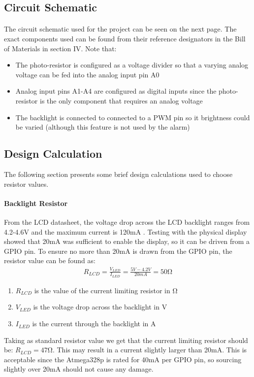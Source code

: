 \documentclass{article}
\begin{document}
\subsection{Circuit Schematic}
\paragraph{}
The circuit schematic used for the project can be seen on the next page. The exact components used can be found from their reference designators in the Bill of Materials in section IV. Note that:
\begin{itemize}
    \item The photo-resistor is configured as a voltage divider so that a varying analog voltage can be fed into the analog input pin A0
    \item Analog input pins A1-A4 are configured as digital inputs since the photo-resistor is the only component that requires an analog voltage
    \item The backlight is connected to connected to a PWM pin so it brightness could be varied (although this feature is not used by the alarm)
\end{itemize}

\subsection{Design Calculation}
The following section presents some brief design calculations used to choose resistor values.

\paragraph{Backlight Resistor} From the LCD datasheet, the voltage drop across the LCD backlight ranges from 4.2-4.6V and the maximum current is 120mA \cite{lcd}. Testing with the physical display showed that 20mA was sufficient to enable the display, so it can be driven from a GPIO pin. To ensure no more than 20mA is drawn from the GPIO pin, the resistor value can be found as:
\begin{align}
    R_{LCD} =\frac{V_{LED}}{I_{LED}}=\frac{5\si{V}-4.2\si{V}}{20\si{mA}}=50\si{\ohm}
\end{align}
\begin{enumerate}
    \item $R_{LCD}$ is the value of the current limiting resistor in $\si{\ohm}$
    \item $V_{LED}$ is the voltage drop across the backlight in V
    \item $I_{LED}$ is the current through the backlight in A
\end{enumerate}
Taking as standard resistor value we get that the current limiting resistor should be: $R_{LCD}=47\si{\ohm}$. This may result in a current slightly larger than 20mA. This is acceptable since the Atmega328p is rated for 40mA per GPIO pin, so sourcing slightly over 20mA should not cause any damage.
\end{document}
